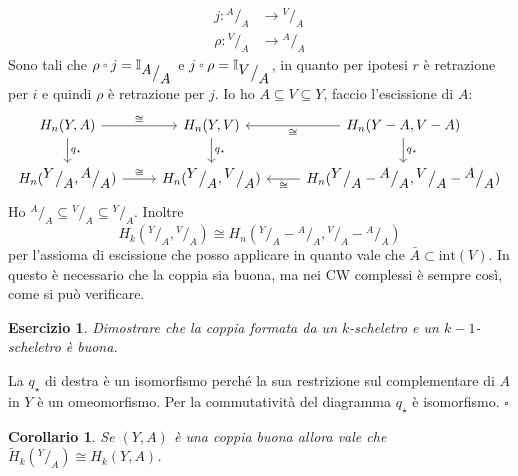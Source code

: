 \documentclass[10pt, twoside=false, x11names]{scrbook}
\newtheorem{corollary}[theorem]{Corollario}
\newcounter{exercises}
\newtheorem{exercise}[exercises]{Esercizio}
\newenvironment{proof}{{\textbf{Dimostrazione}:}}{\hfill $\square$}
\newcommand{\Id}[1][]{\mathbb{I}_#1}
\newcommand*\quot[2]{{^{\textstyle #1}\big/_{\textstyle #2}}}
\let\latexcirc=\circ
\newcommand{\ccirc}{\mathbin{\mathchoice
  {\xcirc\scriptstyle}
  {\xcirc\scriptstyle}
  {\xcirc\scriptscriptstyle}
  {\xcirc\scriptscriptstyle}
}}
\newcommand{\xcirc}[1]{\vcenter{\hbox{$#1\latexcirc$}}}
\let\circ\ccirc
\let\setminus-
\begin{document}
\begin{proof}
\begin{align*}
    j \colon \quot{A}{A} & \to \quot{V}{A} \\
    \rho \colon \quot{V}{A} & \to \quot{A}{A}
  \end{align*}
  Sono tali che $ \rho \circ j = \Id{\quot{A}{A}} $ e $ j \circ \rho = \Id{\quot{V}{A}} $,
  in quanto per ipotesi $ r $ è retrazione per $ i $ e
  quindi $ \rho $ è retrazione per $ j $.
  Io ho $ A \subseteq V \subseteq Y $, faccio l'escissione di $ A $:
  \[
    \begin{tikzcd}
      H_n(Y,A) \rar{\cong} \dar{q_\star} & H_n(Y,V)  \dar{q_\star}& H_n({Y} \setminus {A}, {V} \setminus {A}) \lar{\cong} \dar{q_\star} \\
      H_n(\quot{Y}{A}, \quot{A}{A}) \rar{\cong} & H_n(\quot{Y}{A}, \quot{V}{A}) & H_n(\quot{Y}{A} \setminus \quot{A}{A}, \quot{V}{A} \setminus \quot{A}{A}) \lar{\cong}
    \end{tikzcd}
  \]
  Ho $ \quot{A}{A} \subseteq \quot{V}{A} \subseteq \quot{Y}{A} $.
  Inoltre
  \[
    H_k(\quot{Y}{A}, \quot{V}{A}) \cong H_n(\quot{Y}{A} \setminus \quot{A}{A}, \quot{V}{A} \setminus \quot{A}{A})
  \]
  per l'assioma di escissione che posso applicare in quanto vale che $ \bar{A} \subset \mathrm{int}(V) $.
  In questo è necessario che la coppia sia buona, ma nei CW complessi è sempre così, come si può
  verificare.
  \begin{exercise}
    Dimostrare che la coppia formata da un $ k $-scheletro e un $ k-1 $-scheletro è buona.
  \end{exercise}
  La $ q_\star $ di destra è un isomorfismo perché la sua restrizione sul complementare di $ A $
  in $ Y $ è un omeomorfismo. Per la commutatività del diagramma $ q_\star $ è isomorfismo.
\end{proof}
\begin{corollary}
  Se $ (Y,A) $ è una coppia buona allora vale che $ \tilde{H}_k(\quot{Y}{A}) \cong H_k(Y,A) $.
\end{corollary}
\end{document}

